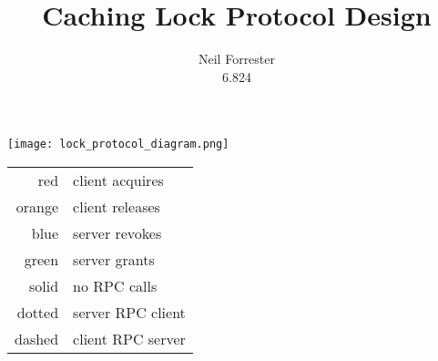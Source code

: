 \documentclass{article}
\title{Caching Lock Protocol Design}
\author{Neil Forrester\\6.824}
\begin{document}
\texttt{[image: lock\_protocol\_diagram.png]}

\begin{tabular}{r | l}
red & client acquires \\
orange & client releases \\
\hline
blue & server revokes \\
green & server grants \\
\hline
solid & no RPC calls \\
dotted & server RPC client \\
dashed & client RPC server \\
\end{tabular}
\end{document}
